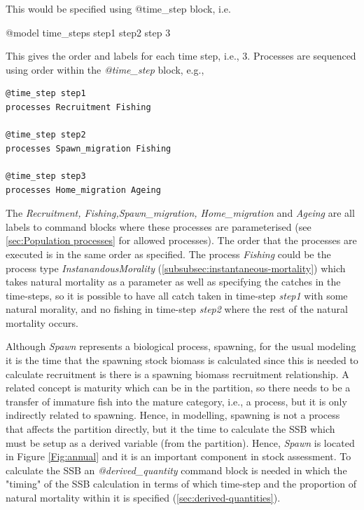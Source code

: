 This would be specified using @time\_step block, i.e.

@model
time\_steps step1 step2 step 3

This gives the order and labels for each time step, i.e., 3. Processes are sequenced using order within the \textit{@time\_step} block, e.g.,

{\small{\begin{verbatim}
@time_step step1
processes Recruitment Fishing

@time_step step2
processes Spawn_migration Fishing

@time_step step3
processes Home_migration Ageing
\end{verbatim}}}

The \textit{Recruitment,  Fishing,Spawn\_migration, Home\_migration} and \textit{ Ageing } are all labels to command blocks where these processes are parameterised (see \ref{sec:Population processes} for allowed processes). The order that the  processes are executed is in the same order as specified. The process \textit{Fishing} could be the process type \textit{InstanandousMorality} (\ref{subsubsec:instantaneous-mortality}) which takes natural mortality as a parameter as well as specifying the catches in the time-steps, so it is possible to have all catch taken in time-step \textit{step1} with some natural morality, and no fishing in time-step \textit{step2} where the rest of the natural mortality occurs.

Although \textit{Spawn} represents a biological process, spawning, for the usual modeling it is the time that the spawning stock biomass is calculated since this is needed to calculate recruitment is there is a spawning biomass recruitment relationship. A related concept is maturity which can be in the partition, so there needs to be a transfer of immature fish into the mature category, i.e., a process, but it is only indirectly related to spawning. Hence, in modelling, spawning is not a process that affects the partition directly, but it the time to calculate the SSB which must be setup as a derived variable (from the partition). Hence, \textit{Spawn} is located in Figure \ref{Fig:annual} and it is an important component in stock assessment. To calculate the SSB an \textit{@derived\_quantity} command block is needed in which the "timing" of the SSB calculation in terms of which time-step and the proportion of natural mortality within it is specified (\ref{sec:derived-quantities}).

\subsubsection{}\label{subsec:initialisation}

